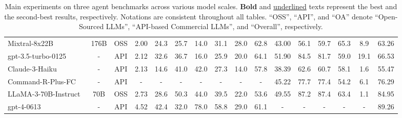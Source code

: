 \begin{table*}[t]
\begin{tabular}{@{}lcc>{}ccccccc>{}ccccc>{}c@{}}
Mixtral-8x22B~\cite{jiang2024mixtral} & 176B & OSS	& 2.00	& 24.3	& 25.7	& 14.0	& 31.1	& 28.0	& 62.8 & 43.00 & 56.1 & 59.7 & 65.3 & 8.9 & 63.26\\
gpt-3.5-turbo-0125~\cite{chatgpt} & - & API & 2.12 &	32.6	&	36.7	&	16.0	&	25.9	&	20.0	&	{64.1} & 51.90 & 84.5 & 81.7 & 59.0 & {19.1} & 66.53 \\
Claude-3-Haiku~\cite{claude-3} & - & API & 2.13	& 14.6	& 41.0	& 42.0	& 27.3	& 14.0	& 57.8 & 38.39 & 62.6 & 60.7 & 58.1 & 1.6 & 55.47 \\
Command-R-Plus-FC~\cite{command-r-plus} & - & API & - & - & - & - & - & - & - & 45.22 & 77.7 & 77.4 & 54.2 & 6.1 & 76.29\\
LLaMA-3-70B-Instruct~\cite{dubey2024llama} & 70B & OSS & 2.73 & 28.6 & {50.3}	& 44.0	& 39.5	& 22.0	& 53.6 & 49.55 & {87.2} & {87.4} & {63.4} & 1.1 & 84.95\\
gpt-4-0613~\cite{achiam2023gpt} & - & API & {4.52} & {42.4} & 32.0 & {78.0} & {58.8} & {29.0} & 61.1 & - & - & - & - & - & {89.26} \\\bottomrule
\end{tabular}
\caption{Main experiments on three agent benchmarks across various model scales. 
\textbf{Bold} and \underline{underlined} texts represent the best and the second-best results, respectively. Notations are consistent throughout all tables. ``OSS'', ``API'', and ``OA'' denote ``Open-Sourced LLMs'', ``API-based Commercial LLMs'', and ``Overall'', respectively.
}\label{tab:agentbench}
\vspace{-1ex}
\end{table*}

